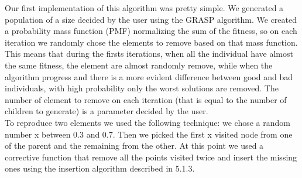 \noindent Our first implementation of this algorithm was pretty simple. We generated a population of a size decided by the user using the GRASP algorithm. We created a probability mass function (PMF) normalizing the sum of the fitness, so on each iteration we randomly chose the elements to remove based on that mass function. This means that during the firsts iterations, when all the individual have almost the same fitness, the element are almost randomly remove, while when the algorithm progress and there is a more evident difference between good and bad individuals, with high probability only the worst solutions are removed. The number of element to remove on each iteration (that is equal to the number of children to generate) is a parameter decided by the user. \\
To reproduce two elements we used the following technique: we chose a random number x between 0.3 and 0.7. Then we picked the first x visited node from one of the parent and the remaining from the other. At this point we used a corrective function that remove all the points visited twice and insert the missing ones using the insertion algorithm described in 5.1.3. 

